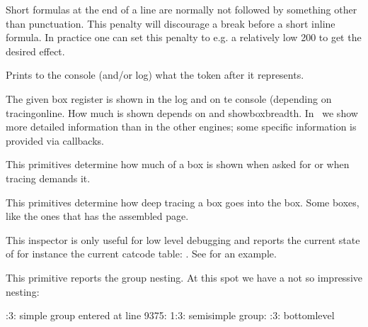 Short formulas at the end of a line are normally not followed by something other
than punctuation. This penalty will discourage a break before a short inline
formula. In practice one can set this penalty to e.g. a relatively low 200 to get
the desired effect.

\stopnewprimitive

\startoldprimitive[title={\prm {show}}]

Prints to the console (and/or log) what the token after
it represents.

\stopoldprimitive

\startoldprimitive[title={\prm {showbox}}]

The given box register is shown in the log and on te console (depending on \prm
{tracingonline}. How much is shown depends on  and \prm
{showboxbreadth}. In \LUAMETATEX\ we show more detailed information than in the
other engines; some specific information is provided via callbacks.

\stopoldprimitive

\startoldprimitive[title={\prm {showboxbreadth}}]

This primitives determine how much of a box is shown when asked for or when
tracing demands it.

\stopoldprimitive

\startoldprimitive[title={\prm {showboxdepth}}]

This primitives determine how deep tracing a box goes into the box. Some boxes,
like the ones that has the assembled page.

\stopoldprimitive

\startnewprimitive[title={\prm {showcodestack}}]

This inspector is only useful for low level debugging and reports the current
state of for instance the current catcode table: \typ {\showcodestack \catcode}.
See  for an example.

\stopnewprimitive

\startoldprimitive[title={\prm {showgroups}}]

This primitive reports the group nesting. At this spot we have a not so
impressive nesting:

:3: simple group entered at line 9375:
1:3: semisimple group: :3: bottomlevel
\stoptyping

\stopoldprimitive

\startoldprimitive[title={\prm {showifs}}]

